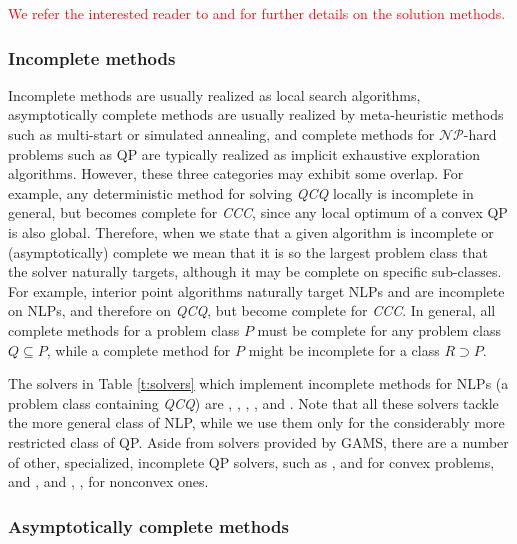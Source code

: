 \textcolor{red}{We refer the interested reader to 
\cite{book:2077007} and 
\cite{lee2006quadratic} for further details on the solution methods.}



\subsubsection{Incomplete methods}

Incomplete methods are usually realized as local search algorithms, asymptotically complete methods are usually realized by meta-heuristic methods such as multi-start or simulated annealing, and complete methods for $\mathcal{NP}$-hard problems such as QP are typically realized as implicit exhaustive exploration algorithms. However, these three categories may exhibit some overlap. For example, any deterministic method for solving \textit{QCQ} locally is incomplete in general, but becomes complete for \textit{CCC}, since any local optimum of a convex QP is also global. Therefore, when we state that a given algorithm is incomplete or (asymptotically) complete we mean that it is so the largest problem class that the solver naturally targets, although it may be complete on specific sub-classes. For example, interior point algorithms naturally target NLPs and are incomplete on NLPs, and therefore on \textit{QCQ}, but become complete for \textit{CCC}. In general, all complete methods for a problem class $P$ must be complete for any problem class $Q \subseteq P$, while a complete method for $P$ might be incomplete for a class $R \supset P$.

The solvers in Table \ref{t:solvers} which implement incomplete methods for NLPs (a problem class containing \textit{QCQ}) are \conopt, \ipopt, \minos, \snopt, and \knitro. Note that all these solvers tackle the more general class of NLP, while we use them only for the considerably more restricted class of QP. Aside from solvers provided by GAMS, there are a number of other, specialized, incomplete QP solvers, such as
\cqp \cite{GoulOrbaRobi13:mpc},
\dqp \cite{GoulRobi16:coap} and
\ooqp \cite{GertWrig03:toms}
for convex problems, and
\bqpd \cite{Flet:2000},
\qpa \cite{GoulToin02i} and
\qpb \cite{ConnGoulOrbaToin:2000},
\qpc \cite{GoulOrbaToin03:toms},
\sqic \cite{Gill2015}
for nonconvex ones.

\subsubsection{Asymptotically complete methods}\label{sss:asymc}

